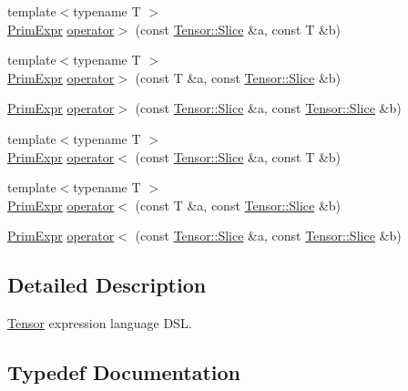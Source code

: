 \begin{DoxyCompactItemize}
\item 
{\footnotesize template$<$typename T $>$ }\\\hyperlink{classtvm_1_1PrimExpr}{Prim\+Expr} \hyperlink{namespacetvm_1_1te_aa8b01278c56c8099c02bf1a614f1a100}{operator$>$} (const \hyperlink{classtvm_1_1te_1_1Tensor_1_1Slice}{Tensor\+::\+Slice} \&a, const T \&b)
\item 
{\footnotesize template$<$typename T $>$ }\\\hyperlink{classtvm_1_1PrimExpr}{Prim\+Expr} \hyperlink{namespacetvm_1_1te_a74074c1b06a426adb0f300944b8c4e88}{operator$>$} (const T \&a, const \hyperlink{classtvm_1_1te_1_1Tensor_1_1Slice}{Tensor\+::\+Slice} \&b)
\item 
\hyperlink{classtvm_1_1PrimExpr}{Prim\+Expr} \hyperlink{namespacetvm_1_1te_af05f53104e6686e271783712280e4005}{operator$>$} (const \hyperlink{classtvm_1_1te_1_1Tensor_1_1Slice}{Tensor\+::\+Slice} \&a, const \hyperlink{classtvm_1_1te_1_1Tensor_1_1Slice}{Tensor\+::\+Slice} \&b)
\item 
{\footnotesize template$<$typename T $>$ }\\\hyperlink{classtvm_1_1PrimExpr}{Prim\+Expr} \hyperlink{namespacetvm_1_1te_a161a27f91902b5a05c0232ebf8562e00}{operator$<$} (const \hyperlink{classtvm_1_1te_1_1Tensor_1_1Slice}{Tensor\+::\+Slice} \&a, const T \&b)
\item 
{\footnotesize template$<$typename T $>$ }\\\hyperlink{classtvm_1_1PrimExpr}{Prim\+Expr} \hyperlink{namespacetvm_1_1te_a825f173e411f783dffef4dc5d1a44b08}{operator$<$} (const T \&a, const \hyperlink{classtvm_1_1te_1_1Tensor_1_1Slice}{Tensor\+::\+Slice} \&b)
\item 
\hyperlink{classtvm_1_1PrimExpr}{Prim\+Expr} \hyperlink{namespacetvm_1_1te_a7585d3a07b7a501536fe8337464d243e}{operator$<$} (const \hyperlink{classtvm_1_1te_1_1Tensor_1_1Slice}{Tensor\+::\+Slice} \&a, const \hyperlink{classtvm_1_1te_1_1Tensor_1_1Slice}{Tensor\+::\+Slice} \&b)
\end{DoxyCompactItemize}


\subsection{Detailed Description}
\hyperlink{classtvm_1_1te_1_1Tensor}{Tensor} expression language D\+SL. 

\subsection{Typedef Documentation}
